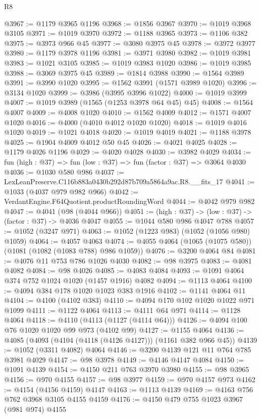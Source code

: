 \begin{lexlean}{R8}
\begin{coremodule}
@3967 := @1179 @3965 @1196
@3968 := @1856 @3967
@3970 := @1019 @3968 @3105
@3971 := @1019 @3970
@3972 := @1188 @3965
@3973 := @1106 @382
@3975 := @3973 @966 @45
@3977 := @3080 @3975 @45
@3978 := @3972 @3977
@3980 := @1179 @3978 @1196
@3981 := @3971 @3980
@3982 := @1019 @3981
@3983 := @1021 @3105
@3985 := @1019 @3983 @1020
@3986 := @1019 @3985
@3988 := @3069 @3975 @45
@3989 := @1814 @3988
@3990 := @1564 @3989
@3991 := @3990 @1020
@3995 := @1562 @3991 (@1571 @3989 @1020)
@3996 := @3134 @1020
@3999 := @3986 (@3995 @3996 @1022)
@4000 := @1019 @3999
@4007 := @1019 @3989 (@1565 (@1253 @3978 @64 @45) @45)
@4008 := @1564 @4007
@4009 := @4008 @1020
@4010 := @1562 @4009
@4012 := @1571 @4007 @1020
@4016 := @4000 (@4010 @4012 @1020 @1020)
@4018 := @1019 @4016 @1020
@4019 := @1021 @4018
@4020 := @1019 @4019
@4021 := @1188 @3978
@4025 := @1904 @4009 @4012 @50 @45
@4026 := @4021 @4025
@4028 := @1179 @4026 @1196
@4029 := @4020 @4028
@4030 := @3982 @4029
@4034 := fun (high : @37) => fun (low : @37) => fun (factor : @37) => @3064 @4030
@4036 := @1030 @580 @986
@4037 := LexLeanPreserve.C116b883a0430b292d87b709a5864a9ac.R8.__fits_17
@4041 := @1033 (@4037 @979 @982 @966)
@4042 := VerdantEngine.F64Quotient.productRoundingWord
@4044 := @4042 @979 @982
@4047 := @4041 (@98 (@4044 @966))
@4051 := (high : @37) -> (low : @37) -> (factor : @37) -> @4036 @4047
@4055 := @1044 @580 @986 @4047 @788
@4057 := @1052 (@3247 @971)
@4063 := @1052 (@1223 @983) (@1052 (@1056 @980) @1059)
@4064 := @4057 @4063
@4074 := @4055 @4064 (@1065 (@1075 @580)) (@1081 (@1082 (@1083 @788) @986 @1059))
@4076 := @3200 @4064 @84
@4081 := @4076 @11 @753 @786 @1026 @4030
@4082 := @98 @3975
@4083 := @4081 @4082
@4084 := @98 @4026
@4085 := @4083 @4084
@4093 := @1091 @4064 @374 @752 @1024 @1020 (@1457 @1916) @4082
@4094 := @1113 @4064
@4100 := @4094 @384 @178 @1020 @1023 @383 @1916
@4102 := @1141 @4064 @11
@4104 := @4100 (@4102 @383)
@4110 := @4094 @170 @102 @1020 @1022 @971 @1099
@4111 := @1122 @4064
@4113 := @4111 @64 @971
@4114 := @1128 @4064
@4118 := @4110 (@4113 (@1127 (@4114 @64)))
@4126 := @4094 @100 @76 @1020 @1020 @99 @973 (@4102 @99)
@4127 := @1155 @4064
@4136 := @4085 (@4093 (@4104 (@4118 (@4126 @4127))) (@1161 @382 @966 @45))
@4139 := @1052 (@3311 @4082) @4064
@4146 := @3200 @4139 @121 @11 @764 @785 @3981 @4029
@4147 := @98 @3978
@4149 := @4146 @4147 @4084
@4150 := @1091 @4139
@4154 := @4150 @211 @763 @3970 @3980
@4155 := @98 @3965
@4156 := @970 @4155
@4157 := @98 @3977
@4159 := @970 @4157 @973
@4162 := @4154 (@4156 @4159) @4147
@4163 := @1113 @4139
@4169 := @4163 @756 @762 @3968 @3105 @4155 @4159
@4176 := @4150 @479 @755 @1023 @3967 (@981 @974) @4155

\end{coremodule}
\end{lexlean}
